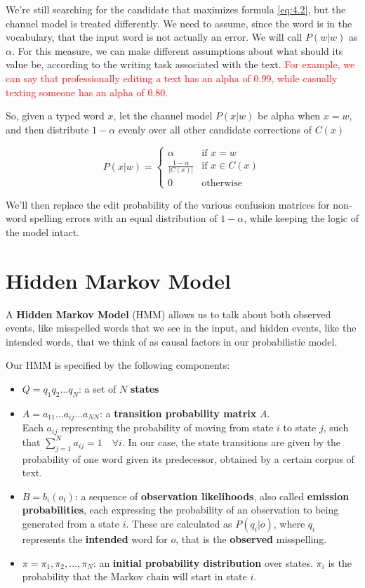 We're still searching for the candidate that maximizes formula \ref{eq:4.2}, but the channel model is treated 
differently. 
We need to assume, since the word is in the vocabulary, that the input word is not actually an error. We will call 
$P(w|w)$ as $\alpha$. For this measure, we can make different assumptions about what should its value be, 
according to the writing task associated with the text. \textcolor{red}{For example, we can say that 
professionally editing a text has an alpha of $0.99$, while casually texting someone has an alpha of $0.80$.}

So, given a typed word $x$, let the channel model $P(x|w)$ be alpha when $x = w$, and then distribute 
$1-\alpha $ evenly over all other candidate corrections of $C(x)$ 

\begin{equation}\label{eq:4.3}
	P(x|w) = \begin{cases} 
	\alpha & \mbox{if } x = w \\ 
	\frac{1-\alpha}{|C(x)|} & \mbox{if }  x \in C(x) \\
	0 & \mbox{otherwise} 
	\end{cases}
\end{equation}

We'll then replace the edit probability of the various confusion matrices for non-word spelling errors with an 
equal distribution of $1-\alpha$, while keeping the logic of the model intact.

\section{Hidden Markov Model}
\label{section:hmm}
A \textbf{Hidden Markov Model} (HMM) allows us to talk about both observed events, like misspelled words that 
we see in the input, and hidden events, like the intended words, that we think of as causal factors in our 
probabilistic model. 

Our HMM is specified by the following components:
\begin{itemize}
	\item $Q = q_1q_2 \dots q_N$: a set of $N$ \textbf{states}
	\item $A=a_{11}	\dots a_{ij} \dots a_{NN}$: a \textbf{transition probability matrix} $A$. \\ Each $a_{ij}$ 
	representing the probability of moving from state $i$ to state $j$, such that $\sum_{j=1}^N a_{ij}=1 \quad 
	\forall i$. In our case, the state transitions are given by the probability of one word given its predecessor, 
	obtained by a certain corpus of text.
	\item $B = b_i (o_t )$: a sequence of \textbf{observation likelihoods}, also called \textbf{emission 
		probabilities}, each expressing the probability of an observation to being generated from a state $i$. These 
	are calculated as $P(q_i|o)$, where $q_i$ represents the \textbf{intended} word for $o$, that is the \textbf{observed} misspelling.
	\item $\pi = \pi_1,\pi_2,\dots,\pi_N$: an \textbf{initial probability distribution} over states. $\pi_i$ is the 
	probability that the Markov chain will start in state $i$. 
\end{itemize}


